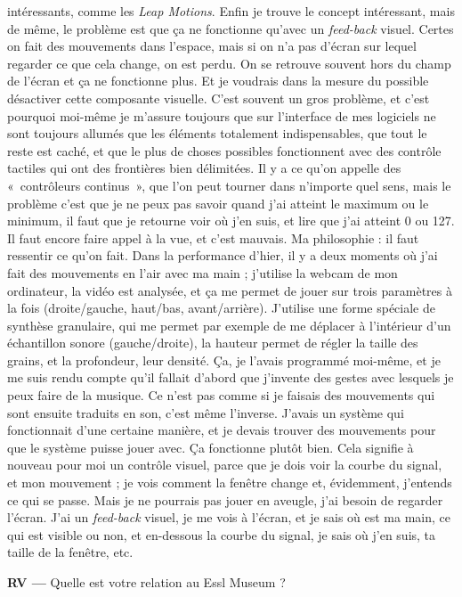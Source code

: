 \documentclass[a4paper,12pt]{article}
\newcommand{\guill}[1]{«~#1~»}
\begin{document}
intéressants, comme les \emph{Leap Motions}. Enfin je trouve le concept intéressant, mais de même, le problème est que ça ne fonctionne qu'avec un \emph{feed-back} visuel. Certes on fait des mouvements dans l'espace, mais si on n'a pas d'écran sur lequel regarder ce que cela change, on est perdu. On se retrouve souvent hors du champ de l'écran et ça ne fonctionne plus. Et je voudrais dans la mesure du possible désactiver cette composante visuelle. C'est souvent un gros problème, et c'est pourquoi moi-même je m'assure toujours que sur l'interface de mes logiciels ne sont toujours allumés que les éléments totalement indispensables, que tout le reste est caché, et que le plus de choses possibles fonctionnent avec des contrôle tactiles qui ont des frontières bien délimitées. Il y a ce qu'on appelle des \guill{contrôleurs continus}, que l'on peut tourner dans n'importe quel sens, mais le problème c'est que je ne peux pas savoir quand j'ai atteint le maximum ou le minimum, il faut que je retourne voir où j'en suis, et lire que j'ai atteint 0 ou 127. Il faut encore faire appel à la vue, et c'est mauvais. Ma philosophie : il faut ressentir ce qu'on fait. Dans la performance d'hier, il y a deux moments où j'ai fait des mouvements en l'air avec ma main ; j'utilise la webcam de mon ordinateur, la vidéo est analysée, et ça me permet de jouer sur trois paramètres à la fois (droite/gauche, haut/bas, avant/arrière). J'utilise une forme spéciale de synthèse granulaire, qui me permet par exemple de me déplacer à l'intérieur d'un échantillon sonore (gauche/droite), la hauteur permet de régler la taille des grains, et la profondeur, leur densité. Ça, je l'avais programmé moi-même, et je me suis rendu compte qu'il fallait d'abord que j'invente des gestes avec lesquels je peux faire de la musique. Ce n'est pas comme si je faisais des mouvements qui sont ensuite traduits en son, c'est même l'inverse. J'avais un système qui fonctionnait d'une certaine manière, et je devais trouver des mouvements pour que le système puisse jouer avec. Ça fonctionne plutôt bien. Cela signifie à nouveau pour moi un contrôle visuel, parce que je dois voir la courbe du signal, et mon mouvement ; je vois comment la fenêtre change et, évidemment, j'entends ce qui se passe. Mais je ne pourrais pas jouer en aveugle, j'ai besoin de regarder l'écran. J'ai un \emph{feed-back} visuel, je me vois à l'écran, et je sais où est ma main, ce qui est visible ou non, et en-dessous la courbe du signal, je sais où j'en suis, ta taille de la fenêtre, etc.

\textbf{RV ---} Quelle est votre relation au Essl Museum ?
\end{document}
